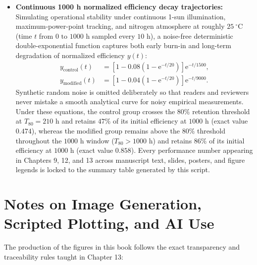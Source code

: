 \begin{itemize}
  \item \textbf{Continuous 1000 h normalized efficiency decay trajectories:} Simulating operational stability under continuous 1-sun illumination, maximum-power-point tracking, and nitrogen atmosphere at roughly $25\ ^\circ\text{C}$ (time $t$ from $0\text{ to }1000\text{ h}$ sampled every $10\text{ h}$), a noise-free deterministic double-exponential function captures both early burn-in and long-term degradation of normalized efficiency $y(t)$:
  \begin{align*}
    y_{\text{control}}(t) &= \left[1 - 0.08\left(1 - \mathrm{e}^{-t/20}\right)\right]\mathrm{e}^{-t/1500}, \\
    y_{\text{modified}}(t) &= \left[1 - 0.04\left(1 - \mathrm{e}^{-t/20}\right)\right]\mathrm{e}^{-t/9000}.
  \end{align*}
  Synthetic random noise is omitted deliberately so that readers and reviewers never mistake a smooth analytical curve for noisy empirical measurements. Under these equations, the control group crosses the $80\%$ retention threshold at $T_{80} = 210\text{ h}$ and retains $47\%$ of its initial efficiency at $1000\text{ h}$ (exact value $0.474$), whereas the modified group remains above the $80\%$ threshold throughout the $1000\text{ h}$ window ($T_{80} > 1000\text{ h}$) and retains $86\%$ of its initial efficiency at $1000\text{ h}$ (exact value $0.858$). Every performance number appearing in Chapters 9, 12, and 13 across manuscript text, slides, posters, and figure legends is locked to the summary table generated by this script.
\end{itemize}

\section{Notes on Image Generation, Scripted Plotting, and AI Use}

The production of the figures in this book follows the exact transparency and traceability rules taught in Chapter 13:

